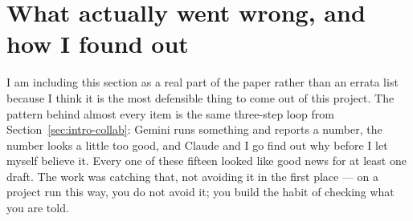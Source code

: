 \documentclass[11pt,letterpaper]{article}
\begin{document}
\section{What actually went wrong, and how I found out}
\label{sec:audit}

I am including this section as a real part of the paper rather than an errata list because I think it is the most defensible thing to come out of this project. The pattern behind almost every item is the same three-step loop from Section~\ref{sec:intro-collab}: Gemini runs something and reports a number, the number looks a little too good, and Claude and I go find out why before I let myself believe it. Every one of these fifteen looked like good news for at least one draft. The work was catching that, not avoiding it in the first place --- on a project run this way, you do not avoid it; you build the habit of checking what you are told.
\end{document}
